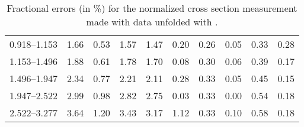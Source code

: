 \begin{table}
\begin{center}
\begin{tabular}{@{}l l l l l l l l l l@{}}
            0.918--1.153     &  1.66   &  0.53   &  1.57         &  1.47      &  0.20    &  0.26  &  0.05       &  0.33  &  0.28  \\
            1.153--1.496     &  1.88   &  0.61   &  1.78         &  1.70      &  0.08    &  0.30  &  0.06       &  0.39  &  0.17  \\
            1.496--1.947     &  2.34   &  0.77   &  2.21         &  2.11      &  0.28    &  0.33  &  0.05       &  0.45  &  0.15  \\
            1.947--2.522     &  2.99   &  0.98   &  2.82         &  2.75      &  0.03    &  0.33  &  0.00       &  0.54  &  0.18  \\
            2.522--3.277     &  3.64   &  1.20   &  3.43         &  3.17      &  1.12    &  0.33  &  0.10       &  0.58  &  0.18  \\
            \bottomrule
        \end{tabular}
    \end{center}
    \caption{
        Fractional errors (in \%) for the normalized cross section measurement
        made with data unfolded with \POWHEG.
    }
    \label{tab:sys_uncert_norm_powheg}
\end{table}
